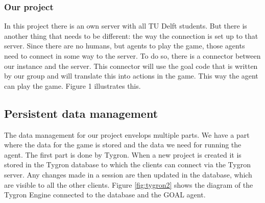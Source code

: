 \subsubsection{Our project}

In this project there is an own server with all TU Delft students. But there is another thing that needs to be different: the way the connection is set up to that server. Since there are no humans, but agents to play the game, those agents need to connect in some way to the server. To do so, there is a connector between our instance and the server. This connector will use the goal code that is written by our group and will translate this into actions in the game. This way the agent can play the game. Figure 1 illustrates this.

\newpage
\subsection{Persistent data management}
The data management for our project envelops multiple parts. We have a part where the data for the game is stored and the data we need for running the agent. The first part is done by Tygron. When a new project is created it is stored in the Tygron database to which the clients can connect via the Tygron server. Any changes made in a session are then updated in the database, which are visible to all the other clients. Figure \ref{fig:tygron2} shows the diagram of the Tygron Engine connected to the database and the GOAL agent.

